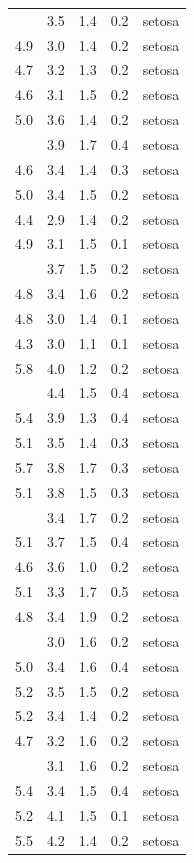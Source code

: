 \documentclass[
]{article}
\begin{document}
\begin{longtable}[t]{lllll}
\endfoot
\bottomrule
\endlastfoot
5.1 & 3.5 & 1.4 & 0.2 & setosa\\
4.9 & 3.0 & 1.4 & 0.2 & setosa\\
4.7 & 3.2 & 1.3 & 0.2 & setosa\\
4.6 & 3.1 & 1.5 & 0.2 & setosa\\
5.0 & 3.6 & 1.4 & 0.2 & setosa\\
\addlinespace
5.4 & 3.9 & 1.7 & 0.4 & setosa\\
4.6 & 3.4 & 1.4 & 0.3 & setosa\\
5.0 & 3.4 & 1.5 & 0.2 & setosa\\
4.4 & 2.9 & 1.4 & 0.2 & setosa\\
4.9 & 3.1 & 1.5 & 0.1 & setosa\\
\addlinespace
5.4 & 3.7 & 1.5 & 0.2 & setosa\\
4.8 & 3.4 & 1.6 & 0.2 & setosa\\
4.8 & 3.0 & 1.4 & 0.1 & setosa\\
4.3 & 3.0 & 1.1 & 0.1 & setosa\\
5.8 & 4.0 & 1.2 & 0.2 & setosa\\
\addlinespace
5.7 & 4.4 & 1.5 & 0.4 & setosa\\
5.4 & 3.9 & 1.3 & 0.4 & setosa\\
5.1 & 3.5 & 1.4 & 0.3 & setosa\\
5.7 & 3.8 & 1.7 & 0.3 & setosa\\
5.1 & 3.8 & 1.5 & 0.3 & setosa\\
\addlinespace
5.4 & 3.4 & 1.7 & 0.2 & setosa\\
5.1 & 3.7 & 1.5 & 0.4 & setosa\\
4.6 & 3.6 & 1.0 & 0.2 & setosa\\
5.1 & 3.3 & 1.7 & 0.5 & setosa\\
4.8 & 3.4 & 1.9 & 0.2 & setosa\\
\addlinespace
5.0 & 3.0 & 1.6 & 0.2 & setosa\\
5.0 & 3.4 & 1.6 & 0.4 & setosa\\
5.2 & 3.5 & 1.5 & 0.2 & setosa\\
5.2 & 3.4 & 1.4 & 0.2 & setosa\\
4.7 & 3.2 & 1.6 & 0.2 & setosa\\
\addlinespace
4.8 & 3.1 & 1.6 & 0.2 & setosa\\
5.4 & 3.4 & 1.5 & 0.4 & setosa\\
5.2 & 4.1 & 1.5 & 0.1 & setosa\\
5.5 & 4.2 & 1.4 & 0.2 & setosa\\

\end{longtable}
\end{document}
